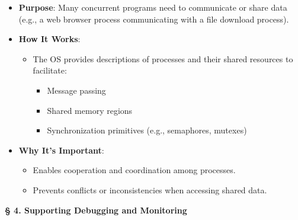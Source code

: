 \documentclass[a4paper]{book}
\newcommand{\sfbf}[1]{{\normalsize\textsf{\textbf{§ #1}}}}
\begin{document}
\begin{itemize}
\item 
\textbf{Purpose}: Many concurrent programs need to communicate or share data (e.g., a web browser process communicating with a file download process).

\item 
\textbf{How It Works}:
\begin{itemize}
\item 
The OS provides descriptions of processes and their shared resources to facilitate:
\begin{itemize}
\item 
Message passing

\item 
Shared memory regions

\item 
Synchronization primitives (e.g., semaphores, mutexes)

\end{itemize}

\end{itemize}

\item 
\textbf{Why It's Important}:
\begin{itemize}
\item 
Enables cooperation and coordination among processes.

\item 
Prevents conflicts or inconsistencies when accessing shared data.

\end{itemize}

\end{itemize}
\hrulefill

\sfbf{4. Supporting Debugging and Monitoring}
\end{document}
